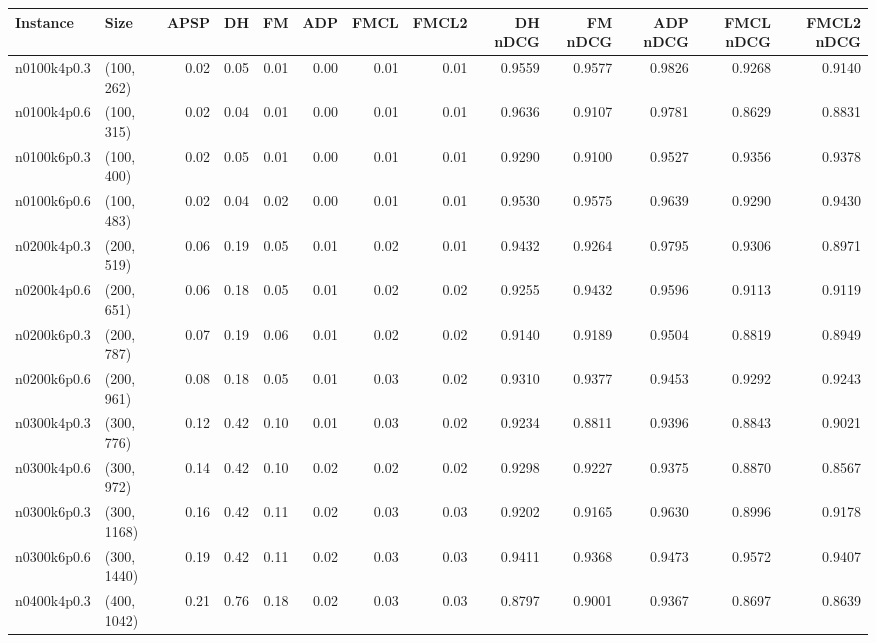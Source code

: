 \begin{tabular}{llrrrrrrrrrrr}
\toprule
   Instance &          Size &   APSP &     DH &    FM &  ADP &  FMCL &  FMCL2 &  DH nDCG &  FM nDCG &  ADP nDCG &  FMCL nDCG &  FMCL2 nDCG \\
\midrule
n0100k4p0.3 &    (100, 262) &   0.02 &   0.05 &  0.01 & 0.00 &  0.01 &   0.01 &   0.9559 &   0.9577 &    0.9826 &     0.9268 &      0.9140 \\
n0100k4p0.6 &    (100, 315) &   0.02 &   0.04 &  0.01 & 0.00 &  0.01 &   0.01 &   0.9636 &   0.9107 &    0.9781 &     0.8629 &      0.8831 \\
n0100k6p0.3 &    (100, 400) &   0.02 &   0.05 &  0.01 & 0.00 &  0.01 &   0.01 &   0.9290 &   0.9100 &    0.9527 &     0.9356 &      0.9378 \\
n0100k6p0.6 &    (100, 483) &   0.02 &   0.04 &  0.02 & 0.00 &  0.01 &   0.01 &   0.9530 &   0.9575 &    0.9639 &     0.9290 &      0.9430 \\
n0200k4p0.3 &    (200, 519) &   0.06 &   0.19 &  0.05 & 0.01 &  0.02 &   0.01 &   0.9432 &   0.9264 &    0.9795 &     0.9306 &      0.8971 \\
n0200k4p0.6 &    (200, 651) &   0.06 &   0.18 &  0.05 & 0.01 &  0.02 &   0.02 &   0.9255 &   0.9432 &    0.9596 &     0.9113 &      0.9119 \\
n0200k6p0.3 &    (200, 787) &   0.07 &   0.19 &  0.06 & 0.01 &  0.02 &   0.02 &   0.9140 &   0.9189 &    0.9504 &     0.8819 &      0.8949 \\
n0200k6p0.6 &    (200, 961) &   0.08 &   0.18 &  0.05 & 0.01 &  0.03 &   0.02 &   0.9310 &   0.9377 &    0.9453 &     0.9292 &      0.9243 \\
n0300k4p0.3 &    (300, 776) &   0.12 &   0.42 &  0.10 & 0.01 &  0.03 &   0.02 &   0.9234 &   0.8811 &    0.9396 &     0.8843 &      0.9021 \\
n0300k4p0.6 &    (300, 972) &   0.14 &   0.42 &  0.10 & 0.02 &  0.02 &   0.02 &   0.9298 &   0.9227 &    0.9375 &     0.8870 &      0.8567 \\
n0300k6p0.3 &   (300, 1168) &   0.16 &   0.42 &  0.11 & 0.02 &  0.03 &   0.03 &   0.9202 &   0.9165 &    0.9630 &     0.8996 &      0.9178 \\
n0300k6p0.6 &   (300, 1440) &   0.19 &   0.42 &  0.11 & 0.02 &  0.03 &   0.03 &   0.9411 &   0.9368 &    0.9473 &     0.9572 &      0.9407 \\
n0400k4p0.3 &   (400, 1042) &   0.21 &   0.76 &  0.18 & 0.02 &  0.03 &   0.03 &   0.8797 &   0.9001 &    0.9367 &     0.8697 &      0.8639 \\

\end{tabular}
